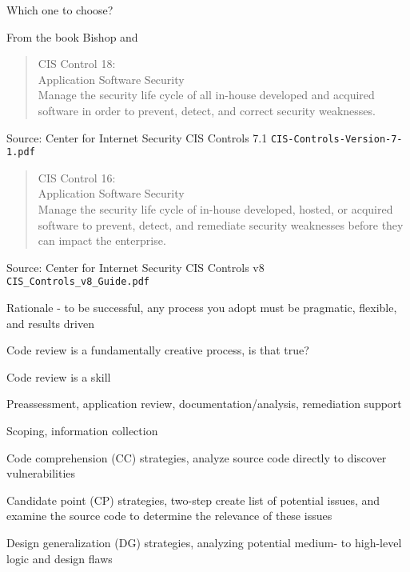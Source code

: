 \documentclass[Screen16to9,17pt]{foils}
\begin{document}
Which one to choose?

From the book Bishop and 



\begin{quote}
CIS Control 18:\\
Application Software Security\\
Manage the security life cycle of all in-house developed and acquired software in order to prevent, detect, and correct security weaknesses.
\end{quote}

Source: Center for Internet Security CIS Controls 7.1 \verb+CIS-Controls-Version-7-1.pdf+

\begin{quote}
CIS Control 16:\\
Application Software Security\\
Manage the security life cycle of in-house developed, hosted,
or acquired software to prevent, detect, and remediate security
weaknesses before they can impact the enterprise.
\end{quote}

Source: Center for Internet Security CIS Controls v8 \verb+CIS_Controls_v8_Guide.pdf+





\begin{list2}
\item Rationale - to be successful, any process you adopt must be pragmatic, flexible, and results driven
\item Code review is a fundamentally creative process, is that true?
\item Code review is a skill
\item Preassessment, application review, documentation/analysis, remediation support
\item Scoping, information collection
\end{list2}


\begin{list2}
\item Code comprehension (CC) strategies, analyze source code directly to discover vulnerabilities
\item Candidate point (CP) strategies, two-step create list of potential issues, and examine the source code to determine the relevance of these issues
\item Design generalization (DG) strategies, analyzing potential medium- to high-level logic and design flaws
\end{list2}
\end{document}
